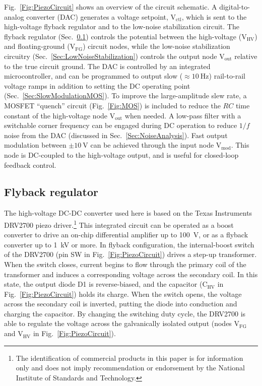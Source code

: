 \documentclass[aip,rsi,reprint]{revtex4-1} %
\begin{document}
Fig.~\ref{Fig:PiezoCircuit} shows an overview of the circuit schematic. 
A digital-to-analog converter (DAC) generates a voltage setpoint, $\text{V}_\text{ctl}$, which is sent to the high-voltage flyback regulator and to the low-noise stabilization circuit.
The flyback regulator (Sec.~\ref{Sec:DRV2700}) controls the potential between the high-voltage ($\text{V}_\text{HV}$) and floating-ground ($\text{V}_\text{FG}$) circuit nodes, while the low-noise stabilization circuitry (Sec.~\ref{Sec:LowNoiseStabilization}) controls the output node $\text{V}_\text{out}$ relative to the true circuit ground.
The DAC is controlled by an integrated microcontroller, and can be programmed to output slow ($\approx\SI{10}{\hertz}$) rail-to-rail voltage ramps in addition to setting the DC operating point (Sec.~\ref{Sec:SlowModulationMOS}).
To improve the large-amplitude slew rate, a MOSFET ``quench'' circuit (Fig.~\ref{Fig:MOS}) is included to reduce the $RC$ time constant of the high-voltage node $\text{V}_\text{out}$ when needed.
A low-pass filter with a switchable corner frequency can be engaged during DC operation to reduce $1/f$ noise from the DAC (discussed in Sec.~\ref{Sec:NoiseAnalysis}).
Fast output modulation between $\pm\SI{10}{\volt}$ can be achieved through the input node $\text{V}_\text{mod}$.
This node is DC-coupled to the high-voltage output, and is useful for closed-loop feedback control.




\subsection{Flyback regulator}
\label{Sec:DRV2700}

The high-voltage DC-DC converter used here is based on the Texas Instruments DRV2700 piezo driver.\footnote{The identification of commercial products in this paper is for information only and does not imply recommendation or endorsement by the National Institute of Standards and Technology.}
This integrated circuit can be operated as a boost converter to drive an on-chip differential amplifier up to \SI{100}{\volt}, or as a flyback converter up to \SI{1}{\kilo\volt} or more.
In flyback configuration, the internal-boost switch of the DRV2700 (pin SW in Fig.~\ref{Fig:PiezoCircuit}) drives a step-up transformer.
When the switch closes, current begins to flow through the primary coil of the transformer and induces a corresponding voltage across the secondary coil.
In this state, the output diode D1 is reverse-biased, and the capacitor ($\text{C}_{\text{HV}}$ in Fig.~\ref{Fig:PiezoCircuit}) holds its charge.
When the switch opens, the voltage across the secondary coil is inverted, putting the diode into conduction and charging the capacitor.
By changing the switching duty cycle, the DRV2700 is able to regulate the voltage across the galvanically isolated output (nodes $\text{V}_\text{FG}$ and $\text{V}_\text{HV}$ in Fig.~\ref{Fig:PiezoCircuit}).
\end{document}
